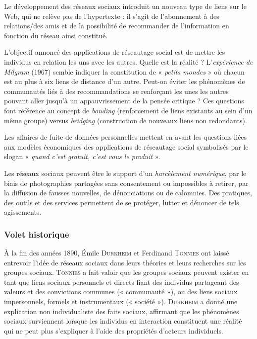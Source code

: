 \begin{tcolorbox}[title={Impacts sur les pratiques humaines}, toprule=0pt, leftrule=0pt, rightrule=0pt, arc=0pt,
                  fonttitle=\scshape\boxtitlefont,
                  colbacktitle=white, coltitle=firstcolor, colframe=firstcolor, colback=firstcolor!10,
                  breakable, enhanced jigsaw]
Le développement des réseaux sociaux introduit un nouveau type de liens sur le Web, qui ne relève pas de l’hypertexte : il s’agit de l’abonnement à des relations/des amis et de la possibilité de recommander de l’information en fonction du réseau ainsi constitué.

L’objectif annoncé des applications de réseautage social est de mettre les individus en relation les uns avec les autres. Quelle est la réalité ? L’\emph{expérience de Milgram} (1967) semble indiquer la constitution de « \emph{petits mondes} » où chacun est au plus à six liens de distance d’un autre. Peut-on éviter les phénomènes de communautés liés à des recommandations se renforçant les unes les autres pouvant aller jusqu’à un appauvrissement de la pensée critique ? Ces questions font référence au concept de \textit{bonding} (renforcement de liens existants au sein d’un même groupe) versus \textit{bridging} (construction de nouveaux liens non redondants).

Les affaires de fuite de données personnelles mettent en avant les questions liées aux modèles économiques des applications de réseautage social symbolisés par le slogan « \textit{quand c’est gratuit, c’est vous le produit} ».

Les réseaux sociaux peuvent être le support d’un \emph{harcèlement numérique}, par le biais de photographies partagées sans consentement ou impossibles à retirer, par la diffusion de fausses nouvelles, de dénonciations ou de calomnies. Des pratiques, des outils et des services permettent de se protéger, lutter et dénoncer de tels agissements.
\end{tcolorbox}


\subsubsection[Volet historique]{Volet historique}
\label{subsub:IX.3.1.2}

À la fin des années 1890, Émile \textsc{Durkheim} et Ferdinand \textsc{Tönnies} ont laissé entrevoir l'idée de réseaux sociaux dans leurs théories et leurs recherches sur les groupes sociaux. \textsc{Tönnies} a fait valoir que les groupes sociaux peuvent exister en tant que liens sociaux personnels et directs liant des individus partageant des valeurs et des convictions communes (« communauté »), ou des liens sociaux impersonnels, formels et instrumentaux (« société »). \textsc{Durkheim} a donné une explication non individualiste des faits sociaux, affirmant que les phénomènes sociaux surviennent lorsque les individus en interaction constituent une réalité qui ne peut plus s'expliquer à l'aide des propriétés d'acteurs individuels.

